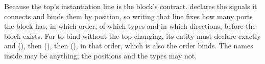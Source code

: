  Because the top's instantiation line is the block's contract.  declares the
signals it connects and binds them by position, so writing that line fixes how many ports the
block has, in which order, of which types and in which directions, before the block exists. For
 to bind without the top changing, its entity must declare exactly
 and  (), then 
(), then  (), in that order, which is
also the order  binds. The names inside may be anything; the positions and the
types may not.
